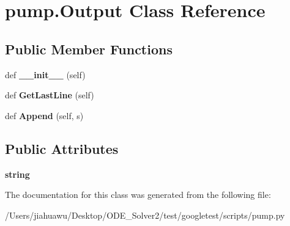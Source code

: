 \hypertarget{classpump_1_1_output}{}\section{pump.\+Output Class Reference}
\label{classpump_1_1_output}
\subsection*{Public Member Functions}
\begin{DoxyCompactItemize}
\item 
\mbox{\label{classpump_1_1_output_a01a703055e40078561bd4a5011de4a6d}} 
def {\bfseries \+\_\+\+\_\+init\+\_\+\+\_\+} (self)
\item 
\mbox{\label{classpump_1_1_output_a6ece94d24be171bae2a2234c052b4c58}} 
def {\bfseries Get\+Last\+Line} (self)
\item 
\mbox{\label{classpump_1_1_output_a6f284bb3f80e03594bc28286c695f5a7}} 
def {\bfseries Append} (self, s)
\end{DoxyCompactItemize}
\subsection*{Public Attributes}
\begin{DoxyCompactItemize}
\item 
\mbox{\label{classpump_1_1_output_a8786848ab3d235189379c449a446f883}} 
{\bfseries string}
\end{DoxyCompactItemize}


The documentation for this class was generated from the following file\+:\begin{DoxyCompactItemize}
\item 
/\+Users/jiahuawu/\+Desktop/\+O\+D\+E\+\_\+\+Solver2/test/googletest/scripts/pump.\+py\end{DoxyCompactItemize}
